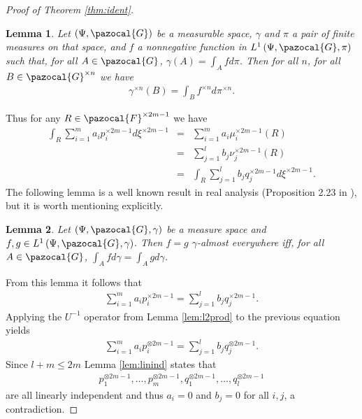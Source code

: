 \documentclass[aos,preprint]{imsart}
\def\sF{\pazocal{F}}
\def\sG{\pazocal{G}}
\theoremstyle{plain}
\newtheorem{lem}{Lemma}[section]
\theoremstyle{defintion}
\begin{document}
\begin{proof}[Proof of Theorem \ref{thm:ident}]
		\begin{lem} \label{lem:radprod}
			Let $\left( \Psi, \sG \right)$ be a measurable space, $\gamma$ and $\pi$ a pair of finite measures on that space, and $f$ a nonnegative function in $L^1\left(\Psi,\sG, \pi \right)$ such that, for all $A \in \sG$, $\gamma\left( A \right)=\int_A f d\pi$. Then for all $n$, for all $B \in \sG^{\times n}$ we have
			\begin{eqnarray*}
				\gamma^{\times n}\left( B \right) = \int_B f^{\times n} d\pi^{\times n}.
			\end{eqnarray*}
		\end{lem}
		Thus for any $R \in \sF^{\times 2m-1}$  we have
		\begin{eqnarray*}
			\int_R \sum_{i=1}^{m} a_i p_i^{\times 2m-1} d\xi^{\times 2m-1} 
			&=&  \sum_{i=1}^{m} a_i \mu_i^{\times 2m-1}\left( R \right)\\
		 &=&  \sum_{j=1}^{l} b_j \nu_j^{\times 2m-1}\left( R \right)\\
		 &=& \int_R \sum_{j=1}^{l} b_j q_j^{\times 2m-1}d\xi^{\times 2m-1}.
		\end{eqnarray*}
		The following lemma is a well known result in real analysis (Proposition 2.23 in \cite{folland99}), but it is worth mentioning explicitly.
		\begin{lem} \label{lem:inteq}
			Let $\left( \Psi,\sG,\gamma \right)$ be a measure space and $f,g \in L^1\left( \Psi,\sG,\gamma \right)$. Then $f=g$ $\gamma$-almost everywhere iff, for all $A\in \sG$, $\int_A f d\gamma = \int_A g d\gamma$.
		\end{lem}
		From this lemma it follows that
		\begin{eqnarray*}
			\sum_{i=1}^{m} a_i p_i^{\times 2m-1} = \sum_{j=1}^{l} b_j q_j^{\times 2m-1}.
		\end{eqnarray*}
		Applying the $U^{-1}$ operator from Lemma \ref{lem:l2prod} to the previous equation yields
		\begin{eqnarray*}
			\sum_{i=1}^{m} a_i p_i^{\otimes 2m-1} = \sum_{j=1}^{l} b_j q_j^{\otimes 2m-1}.
		\end{eqnarray*}
		Since $l+m \le2m$ Lemma \ref{lem:linind} states that 
		\begin{align*}
			p_1^{\otimes 2m-1},\ldots,p_{m}^{\otimes 2m-1},q_1^{\otimes 2m-1},\ldots,q_{l}^{\otimes 2m-1}
		\end{align*}
		are all linearly independent and thus $a_i = 0$ and $b_j = 0$ for all $i,j$, a contradiction.
	\end{proof}
\end{document}
